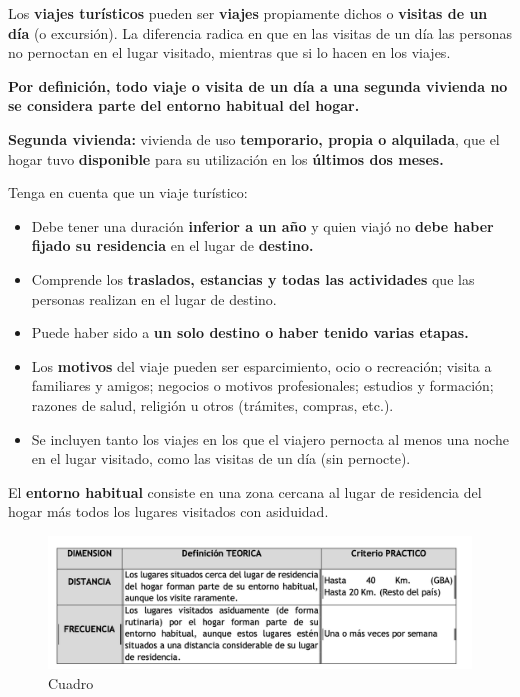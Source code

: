 \documentclass[
  openany]{book}
\begin{document}
Los \textbf{viajes turísticos} pueden ser \textbf{viajes} propiamente dichos o \textbf{visitas de un día} (o excursión). La diferencia radica en que en las visitas de un día las personas no pernoctan en el lugar visitado, mientras que si lo hacen en los viajes.

\textbf{Por definición, todo viaje o visita de un día a una segunda vivienda no se considera parte del entorno habitual del hogar.}

\textbf{Segunda vivienda:} vivienda de uso \textbf{temporario, propia o alquilada}, que el hogar tuvo \textbf{disponible} para su utilización en los \textbf{últimos dos meses.}

Tenga en cuenta que un viaje turístico:

\begin{itemize}
\item
  Debe tener una duración \textbf{inferior a un año} y quien viajó no \textbf{debe haber fijado su residencia} en el lugar de \textbf{destino.}
\item
  Comprende los \textbf{traslados, estancias y todas las actividades} que las personas realizan en el lugar de destino.
\item
  Puede haber sido a \textbf{un solo destino o haber tenido varias etapas.}
\item
  Los \textbf{motivos} del viaje pueden ser esparcimiento, ocio o recreación; visita a familiares y amigos; negocios o motivos profesionales; estudios y formación; razones de salud, religión u otros (trámites, compras, etc.).
\item
  Se incluyen tanto los viajes en los que el viajero pernocta al menos una noche en el lugar visitado, como las visitas de un día (sin pernocte).
\end{itemize}

El \textbf{entorno habitual} consiste en una zona cercana al lugar de residencia del hogar más todos los lugares visitados con asiduidad.

\begin{figure}

{\centering \includegraphics[width=1\linewidth]{imagenes/figura6-21} 

}

\caption{Cuadro}\label{fig:Cuadr}
\end{figure}
\end{document}
